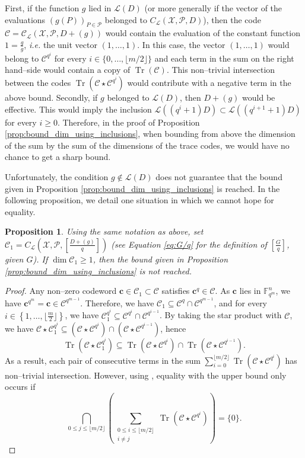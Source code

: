 \documentclass[journal]{IEEEtran}
\theoremstyle{plain}
\newtheorem{proposition}[thm]{Proposition}
\theoremstyle{definition}
\theoremstyle{remark}
\DeclareMathOperator{\trace}{Tr}
\newcommand{\calP}{\mathcal{P}}
\newcommand{\calL}{\mathcal{L}}
\newcommand{\calC}{\mathcal{C}}
\newcommand{\calX}{\mathcal{X}}
\newcommand{\fqm}{\mathbb{F}_{q^m}}
\newcommand{\Tr}[1]{\trace\!\left(#1\right)}
\newcommand{\set}[1]{\left\{#1\right\}}
\begin{document}
	First, if the function $g$ lied in $\calL(D)$ (or more generally if the vector of the evaluations $(g(P))_{P \in \calP}$ belonged to $C_\calL(\calX,\calP,D)$), then the code $\calC= \calC_{\calL}(\calX,\calP,D+(g))$ would contain the evaluation of the constant function $1=\frac{g}{g}$, \textit{i.e.} the unit vector $(1,\dots,1)$. In this case, the vector $(1,\dots,1)$ would belong to $\calC^{q^i}$ for every $i \in \{0,\dots, \lfloor{m/2} \rfloor\}$ and each term in the sum on the right hand--side would contain a copy of $\Tr{\calC}$. This non--trivial intersection between the codes $\Tr{\calC\star \calC^{q^i}}$ would contribute with a negative term in the above bound.
	Secondly, if $g$ belonged to $\calL(D)$, then $D+(g)$ would be effective. This would imply the inclusion $\calL((q^i+1)D) \subset \calL((q^{i+1}+1)D)$ for every $i \geq 0$. Therefore, in the proof of Proposition \ref{prop:bound_dim_using_inclusions}, when bounding from above the dimension of the sum by the sum of the dimensions of the trace codes, we would have no chance to get a sharp bound.
	
	Unfortunately, the condition $g \notin \calL(D)$ does not guarantee that the bound given in Proposition \ref{prop:bound_dim_using_inclusions} is reached. In the following proposition, we detail one situation in which we cannot hope for equality.
	
	\begin{proposition}\label{prop:non-eq}
		Using the same notation as above, set $\calC_1=C_{\calL}\left(\calX,\mathcal{P},\left[ \frac{D+(g)}{q} \right]\right)$ (see Equation \eqref{eq:G/q} for the definition of $\left[ \frac{G}{q} \right]$, given $G$). If $\dim \calC_1 \geq 1$, then the bound given in Proposition \ref{prop:bound_dim_using_inclusions} is not reached.
	\end{proposition}
	
	\begin{proof}
		Any non--zero codeword $\mathbf{c} \in  \calC_1 \subset \calC$ satisfies $\mathbf{c}^q \in \calC$. As $\mathbf{c}$ lies in $\fqm^n$, we have $\mathbf{c}^{q^m}=\mathbf{c} \in \calC^{q^{m-1}}$. Therefore,  we have $\calC_1 \subseteq \calC^{q} \cap \calC^{q^{m-1}}$, and for every $i \in \set{1,\dots,\lfloor \frac{m}{2}\rfloor}$, we have $\calC_1^{q^i} \subseteq \calC^{q^i} \cap \calC^{q^{i-1}}$. By taking the star product with $\calC$, we have $\calC \star \calC_1^{q^i} \subseteq \left(\calC \star  \calC^{q^i}\right) \cap \left(\calC \star  \calC^{q^{i-1}}\right)$, hence
		\[\Tr{\calC\star\calC_1^{q^i}} \subseteq \Tr{\calC\star\calC^{q^i}} \cap \Tr{\calC\star\calC^{q^{i-1}}}.\]
		As a result, each pair of consecutive terms in the sum $\sum\limits_{i=0}^{\lfloor m/2 \rfloor} \Tr{\calC \star \calC^{q^i}}$ has non--trivial intersection. However, using \cite[Theorem~2]{T19}, equality with the upper bound only occurs if
		\[\bigcap_{0\leq j \leq \lfloor m/2\rfloor} \left( \sum_{\substack{0\leq i \leq \lfloor m/2 \rfloor\\ i\neq j}} \Tr{\calC \star \calC^{q^i}} \right)= \{0\}.\]
	\end{proof}
	
\end{document}

